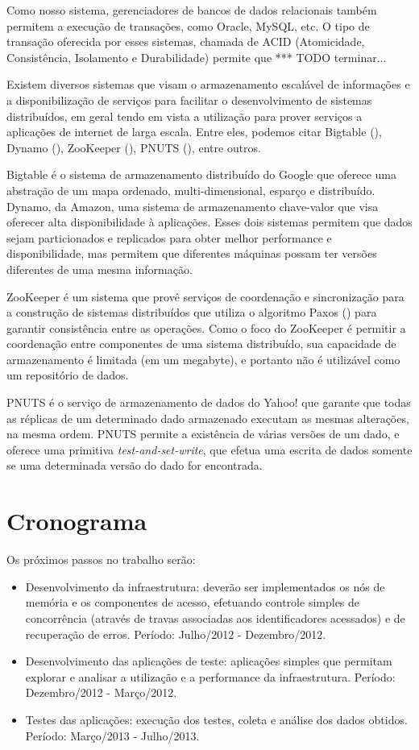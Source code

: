 \documentclass[11pt,twoside,a4paper]{book}
\begin{document}
Como nosso sistema, gerenciadores de bancos de dados relacionais também permitem a execução de transações, como Oracle, MySQL, etc. O tipo de transação oferecida por esses sistemas, chamada de ACID (Atomicidade, Consistência, Isolamento e Durabilidade) permite que *** TODO terminar...

Existem diversos sistemas que visam o armazenamento escalável de informações e a disponibilização de serviços para facilitar o desenvolvimento de sistemas distribuídos, em geral tendo em vista a utilização para prover serviços a aplicações de internet de larga escala. Entre eles, podemos citar Bigtable (\cite{bigtable}), Dynamo (\cite{dynamo}), ZooKeeper (\cite{zookeeper}), PNUTS (\cite{pnuts}), entre outros. 

Bigtable é o sistema de armazenamento distribuído do Google que oferece uma abstração de um mapa ordenado, multi-dimensional, esparço e distribuído. Dynamo, da Amazon, uma sistema de armazenamento chave-valor que visa oferecer alta disponibilidade à aplicações. Esses dois sistemas permitem que dados sejam particionados e replicados para obter melhor performance e disponibilidade, mas permitem que diferentes máquinas possam ter versões diferentes de uma mesma informação. 

ZooKeeper é um sistema que provê serviços de coordenação e sincronização para a construção de sistemas distribuídos que utiliza o algoritmo Paxos (\cite{paxos}) para garantir consistência entre as operações. Como o foco do ZooKeeper é permitir a coordenação entre componentes de uma sistema distribuído, sua capacidade de armazenamento é limitada (em um megabyte), e portanto não é utilizável como um repositório de dados.

PNUTS é o serviço de armazenamento de dados do Yahoo! que garante que todas as réplicas de um determinado dado armazenado executam as mesmas alterações, na mesma ordem. PNUTS permite a existência de várias versões de um dado, e oferece uma primitiva \emph{test-and-set-write}, que efetua uma escrita de dados somente se uma determinada versão do dado for encontrada.


\chapter{Cronograma}
\label{chap:cronograma}
Os próximos passos no trabalho serão:

\begin{itemize}
\item Desenvolvimento da infraestrutura: deverão ser implementados os nós de memória e os componentes de acesso, efetuando controle simples de concorrência (através de travas associadas aos identificadores acessados) e de recuperação de erros. Período: Julho/2012 - Dezembro/2012.
\item Desenvolvimento das aplicações de teste: aplicações simples que permitam explorar e analisar a utilização e a performance da infraestrutura. Período: Dezembro/2012 - Março/2012.
\item Testes das aplicações: execução dos testes, coleta e análise dos dados obtidos. Período: Março/2013 - Julho/2013.
\end{itemize}
\end{document}
